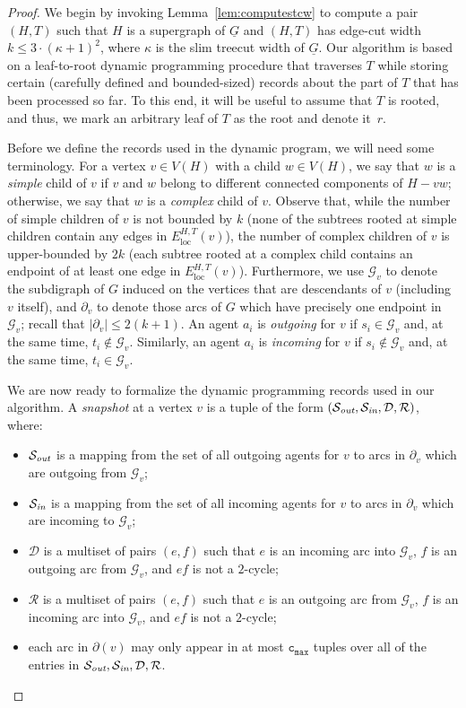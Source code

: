 \documentclass[letterpaper]{article} %
\newcommand{\cmax}{\mathtt{c_{max}}}
\newcommand{\loc}{\operatorname{loc}}
\newcommand{\forgottenG}{\mathcal{G}}
\renewcommand{\R}{\mathcal{R}}
\renewcommand{\D}{\mathcal{D}}
\newcommand{\Sout}{\mathcal{S}_\emph{out}}
\newcommand{\Sin}{\mathcal{S}_\emph{in}}
\begin{document}
\begin{proof}
We begin by invoking Lemma~\ref{lem:computestcw} to compute a pair $(H,T)$ such that $H$ is a supergraph of $\underline G$ and $(H,T)$ has edge-cut width $k\leq 3\cdot (\kappa+1)^2$, where $\kappa$ is the slim treecut width of $\underline G$. Our algorithm is based on a leaf-to-root dynamic programming procedure that traverses $T$ while storing certain (carefully defined and bounded-sized) records about the part of $T$ that has been processed so far. To this end, it will be useful to assume that $T$ is rooted, and thus, we mark an arbitrary leaf of $T$ as the root and denote it~$r$.


Before we define the records used in the dynamic program, we will need some terminology. For a vertex $v\in V(H)$ with a child $w\in V(H)$, we say that $w$ is a \emph{simple} child of $v$ if $v$ and $w$ belong to different connected components of $H-vw$; otherwise, we say that $w$ is a \emph{complex} child of $v$. Observe that, while the number of simple children of $v$ is not bounded by $k$ (none of the subtrees rooted at simple children contain any edges in $E_{\loc}^{H,T}(v)$), the number of complex children of $v$ is upper-bounded by $2k$ (each subtree rooted at a complex child contains an endpoint of at least one edge in $E_{\loc}^{H,T}(v)$). Furthermore, we use $\forgottenG_v$ to denote the subdigraph of $G$ induced on the vertices that are descendants of $v$ (including $v$ itself), and $\partial_v$ to denote those arcs of $G$ which have precisely one endpoint in $\forgottenG_v$; recall that $|\partial_v|\leq 2(k+1)$. An agent $a_i$ is \emph{outgoing} for $v$ if $s_i\in \forgottenG_v$ and, at the same time, $t_i\not \in \forgottenG_v$. Similarly, an agent $a_i$ is \emph{incoming} for $v$ if $s_i\notin \forgottenG_v$ and, at the same time, $t_i \in \forgottenG_v$.

We are now ready to formalize the dynamic programming records used in our algorithm. A \emph{snapshot} at a vertex $v$ is a tuple of the form $(\Sout,\Sin,\D,\R)$, where:

\begin{itemize}[topsep=0pt]
\item $\Sout$ is a mapping from the set of all outgoing agents for $v$ to arcs in $\partial_v$ which are outgoing from $\forgottenG_v$;
\item $\Sin$ is a mapping from the set of all incoming agents for $v$ to arcs in $\partial_v$  which are incoming to $\forgottenG_v$;
\item $\D$ is a multiset of pairs $(e,f)$ such that $e$ is an incoming arc into $\forgottenG_v$, $f$ is an outgoing arc from $\forgottenG_v$, and $ef$ is not a $2$-cycle;
\item $\R$ is a multiset of pairs $(e,f)$ such that $e$ is an outgoing arc from $\forgottenG_v$, $f$ is an incoming arc into $\forgottenG_v$, and $ef$ is not a $2$-cycle;
\item each arc in $\partial(v)$ may only appear in at most $\cmax$ tuples over all of the entries in $\Sout, \Sin, \D, \R$.
\end{itemize}


\end{proof}
\end{document}
